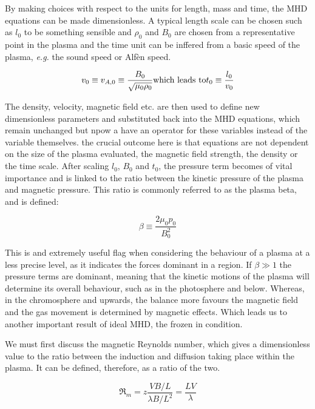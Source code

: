 By making choices with respect to the units for length, mass and time, the MHD equations can be made dimensionless.
A typical length scale can be chosen such as $l_0$ to be something sensible and $\rho_0$ and $B_0$ are chosen from a representative point in the plasma and the time unit can be inffered from a basic speed of the plasma, \emph{e.g.} the sound speed or Alf{\`e}n speed.

\begin{equation}
	v_0 \equiv v_{A,0} \equiv \frac{B_0}{\sqrt{\mu_0\rho_0}} \textnormal{which leads to} t_0 \equiv \frac{l_0}{v_0} 
\end{equation}

The density, velocity, magnetic field etc. are then used to define new dimensionless parameters and substituted back into the MHD equations, which remain unchanged but npow a have an operator for these variables instead of the variable themselves.
the crucial outcome here is that equations are not dependent on the size of the plasma evaluated, the magnetic field strength, the density or the time scale.
After scaling $l_0$, $B_0$ and $t_0$, the pressure term becomes of vital importance and is linked to the ratio between the kinetic pressure of the plasma and magnetic pressure.
This ratio is commonly referred to as the plasma beta, and is defined:

\begin{equation}
	\beta \equiv \frac{2\mu_0p_0}{B_0^2}
\end{equation} 

This is and extremely useful flag when considering the behaviour of a plasma at a less precise level, as it indicates the forces dominant in a region.
If $\beta \gg 1$ the pressure terms are dominant, meaning that the kinetic motions of the plasma will determine its overall behaviour, such as in the photosphere and below.
Whereas, in the chromosphere and upwards, the balance more favours the magnetic field and the gas movement is determined by magnetic effects.
Which leads us to another important result of ideal MHD, the frozen in condition.

We must first discuss the magnetic Reynolds number, which gives a dimensionless value to the ratio between the induction and diffusion taking place within the plasma.
It can be defined, therefore, as a ratio of the two.

\begin{equation}
	\Re_m = z\frac{VB/L}{\lambda B/L^2} = \frac{LV}{\lambda} 
\end{equation}

